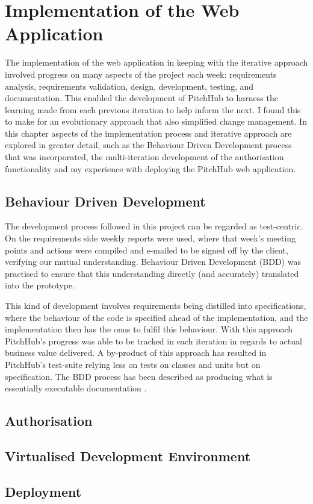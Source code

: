 \chapter{Implementation of the Web Application}
The implementation of the web application in keeping with the iterative approach involved progress on many aspects of the project each week: requirements analysis, requirements validation, design, development, testing, and documentation. This enabled the development of PitchHub to harness the learning made from each previous iteration to help inform the next. I found this to make for an evolutionary approach that also simplified change management. In this chapter aspects of the implementation process and iterative approach are explored in greater detail, such as the Behaviour Driven Development process that was incorporated, the multi-iteration development of the authorisation functionality and my experience with deploying the PitchHub web application.

\section{Behaviour Driven Development}
The development process followed in this project can be regarded as test-centric. On the requirements side weekly reports were used, where that week's meeting points and actions were compiled and e-mailed to be signed off by the client, verifying our mutual understanding. Behaviour Driven Development (BDD) was practised to ensure that this understanding directly (and accurately) translated into the prototype.
\par
This kind of development involves requirements being distilled into specifications, where the behaviour of the code is specified ahead of the implementation, and the implementation then has the onus to fulfil this behaviour. With this approach PitchHub's progress was able to be tracked in each iteration in regards to actual business value delivered. A by-product of this approach has resulted in PitchHub's test-suite relying less on tests on classes and units but on specification. The BDD process has been described as producing what is essentially executable documentation \cite{astels2006new}.
\par


\section{Authorisation}

\section{Virtualised Development Environment}

\section{Deployment}
